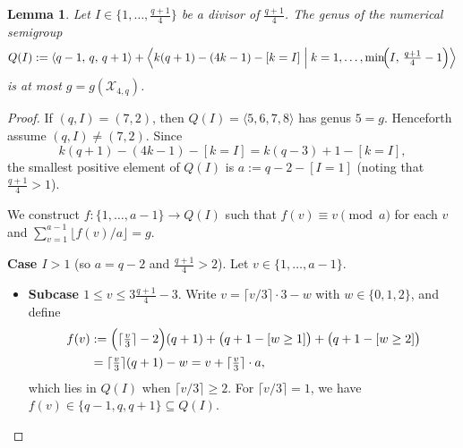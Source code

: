 \documentclass[12pt]{amsart}
\newtheorem{lemma}[theorem]{Lemma}
\theoremstyle{remark}
\theoremstyle{definition}
\newcommand{\coloneqq}{\mathrel{:=}}
\begin{document}
	\begin{lemma}\label{lem:bound genus semigr m4}
    Let $I \in \{1, \ldots, \frac{q+1}{4}\}$ be a divisor of $\frac{q+1}{4}$. 
    The genus of the numerical semigroup
    \[
        Q(I) \coloneqq \langle q-1,\, q,\, q+1 \rangle 
        + \Bigl\langle k(q+1) - (4k-1) - [k=I] \;\Big|\; 
        k = 1, \ldots, \min\!\Bigl(I,\, \tfrac{q+1}{4} - 1\Bigr) \Bigr\rangle
    \]
    is at most $g = g(\mathcal{X}_{4,q})$.
\end{lemma}

\begin{proof}
    If $(q, I) = (7, 2)$, then $Q(I) = \langle 5, 6, 7, 8 \rangle$ has 
    genus $5 = g$. Henceforth assume $(q, I) \neq (7, 2)$. Since
    \[
        k(q+1) - (4k-1) - [k=I] = k(q-3) + 1 - [k=I],
    \]
    the smallest positive element of $Q(I)$ is 
    $a \coloneqq q - 2 - [I=1]$ (noting that $\frac{q+1}{4} > 1$).

    We construct $f \colon \{1, \ldots, a-1\} \to Q(I)$ such that 
    $f(v) \equiv v \pmod{a}$ for each $v$ and 
    $\sum_{v=1}^{a-1} \lfloor f(v)/a \rfloor = g$.

    \medskip
    \noindent\textbf{Case $I > 1$} (so $a = q-2$ and $\frac{q+1}{4} > 2$).
    Let $v \in \{1, \ldots, a-1\}$.

    \begin{itemize}
        \item \textbf{Subcase $1 \le v \le 3\frac{q+1}{4} - 3$}. 
        Write $v = \lceil v/3 \rceil \cdot 3 - w$ with $w \in \{0,1,2\}$, 
        and define
        \begin{align*}
            f(v) &\coloneqq \Bigl(\lceil \tfrac{v}{3} \rceil - 2\Bigr)(q+1) 
            + \bigl(q+1 - [w \ge 1]\bigr) 
            + \bigl(q+1 - [w \ge 2]\bigr) \\
            &= \lceil \tfrac{v}{3} \rceil (q+1) - w 
            = v + \lceil \tfrac{v}{3} \rceil \cdot a,
        \end{align*}
        which lies in $Q(I)$ when $\lceil v/3 \rceil \ge 2$. 
        For $\lceil v/3 \rceil = 1$, we have 
        $f(v) \in \{q-1, q, q+1\} \subseteq Q(I)$.


\end{itemize}
\end{proof}
\end{document}
